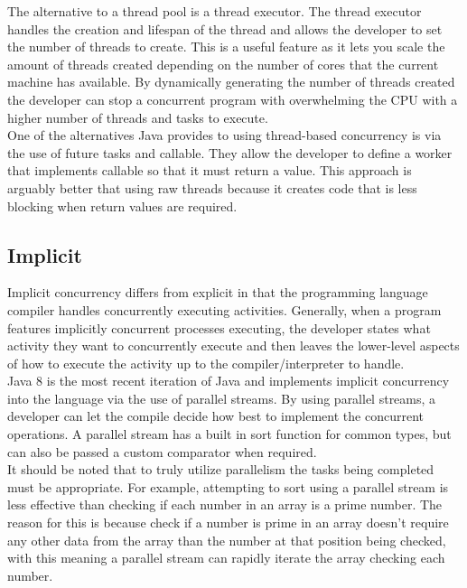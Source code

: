 \documentclass[11pt]{article}  %
\theoremstyle{definition}
\theoremstyle{remark}
\begin{document}
The alternative to a thread pool is a thread executor. The thread executor handles the creation and lifespan of the thread and allows the developer to set the number of threads to create. This is a useful feature as it lets you scale the amount of threads created depending on the number of cores that the current machine has available. By dynamically generating the number of threads created the developer can stop a concurrent program with overwhelming the CPU with a higher number of threads and tasks to execute.\\

One of the alternatives Java provides to using thread-based concurrency is via the use of future tasks and callable. They allow the developer to define a worker that implements callable so that it must return a value. This approach is arguably better that using raw threads because it creates code that is less blocking when return values are required. \\ 


\subsection{Implicit}\label{ss:back}

Implicit concurrency differs from explicit in that the programming language compiler  handles concurrently executing activities. Generally, when a program features implicitly concurrent processes executing, the developer states what activity they want to concurrently execute and then leaves the lower-level aspects of how to execute the activity up to the compiler/interpreter to handle.\\

Java 8 is the most recent iteration of Java and implements implicit concurrency into the language via the use of parallel streams. By using parallel streams, a developer can let the compile decide how best to implement the concurrent operations. A parallel stream has a built in sort function for common types, but can also be passed a custom comparator when required.\\

It should be noted that to truly utilize parallelism the tasks being completed must be appropriate. For example, attempting to sort using a parallel stream is less effective than checking if each number in an array is a prime number. The reason for this is because check if a number is prime in an array doesn’t require any other data from the array than the number at that position being checked, with this meaning a parallel stream can rapidly iterate the array checking each number.\\
\end{document}
